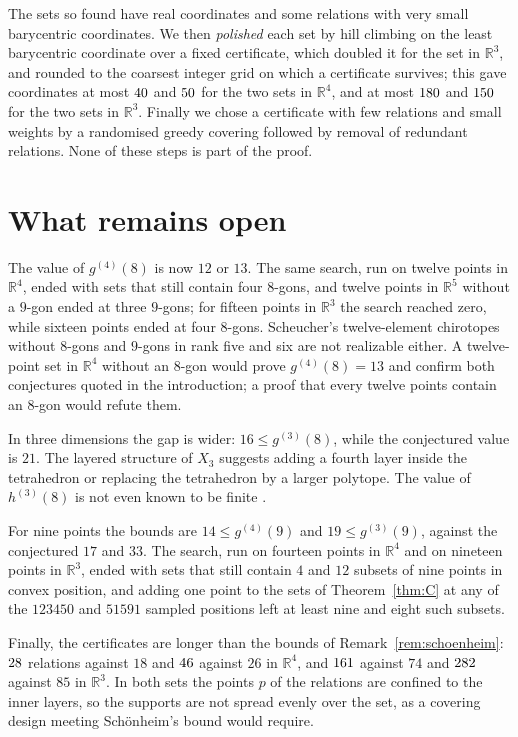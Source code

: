 \documentclass[aps,prd,twocolumn,superscriptaddress,nofootinbib,longbibliography,floatfix,showkeys,amsmath,amssymb,10pt]{revtex4-2}
\theoremstyle{plain}
\theoremstyle{definition}
\theoremstyle{plain}
\newcommand{\R}{\mathbb{R}}
\begin{document}
The sets so found have real coordinates and some relations with very small barycentric coordinates. We then \emph{polished} each set by hill climbing on the least barycentric coordinate over a fixed certificate, which doubled it for the set in $\R^3$, and rounded to the coarsest integer grid on which a certificate survives; this gave coordinates at most $40$ and $50$ for the two sets in $\R^4$, and at most $180$ and $150$ for the two sets in $\R^3$. Finally we chose a certificate with few relations and small weights by a randomised greedy covering followed by removal of redundant relations. None of these steps is part of the proof.

\section{What remains open}\label{sec:open}

The value of $g^{(4)}(8)$ is now $12$ or $13$. The same search, run on twelve points in $\R^4$, ended with sets that still contain four $8$-gons, and twelve points in $\R^5$ without a $9$-gon ended at three $9$-gons; for fifteen points in $\R^3$ the search reached zero, while sixteen points ended at four $8$-gons. Scheucher's twelve-element chirotopes without $8$-gons and $9$-gons in rank five and six are not realizable either. A twelve-point set in $\R^4$ without an $8$-gon would prove $g^{(4)}(8)=13$ and confirm both conjectures quoted in the introduction; a proof that every twelve points contain an $8$-gon would refute them.

In three dimensions the gap is wider: $16\le g^{(3)}(8)$, while the conjectured value is $21$. The layered structure of $X_3$ suggests adding a fourth layer inside the tetrahedron or replacing the tetrahedron by a larger polytope. The value of $h^{(3)}(8)$ is not even known to be finite \cite{Sch23}.

For nine points the bounds are $14\le g^{(4)}(9)$ and $19\le g^{(3)}(9)$, against the conjectured $17$ and $33$. The search, run on fourteen points in $\R^4$ and on nineteen points in $\R^3$, ended with sets that still contain $4$ and $12$ subsets of nine points in convex position, and adding one point to the sets of Theorem~\ref{thm:C} at any of the $123450$ and $51591$ sampled positions left at least nine and eight such subsets.

Finally, the certificates are longer than the bounds of Remark~\ref{rem:schoenheim}: $28$ relations against $18$ and $46$ against $26$ in $\R^4$, and $161$ against $74$ and $282$ against $85$ in $\R^3$. In both sets the points $p$ of the relations are confined to the inner layers, so the supports are not spread evenly over the set, as a covering design meeting Sch\"onheim's bound would require.
\end{document}
